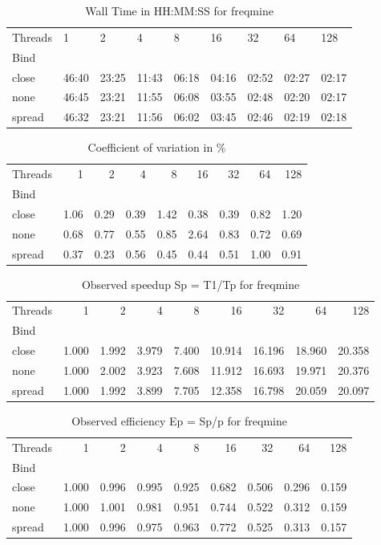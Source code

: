 \begin{table}
\caption{Wall Time in HH:MM:SS for freqmine}
\label{tab:time_freqmine}
\begin{tabular}{lllllllll}
\toprule
Threads & 1 & 2 & 4 & 8 & 16 & 32 & 64 & 128 \\
Bind &  &  &  &  &  &  &  &  \\
\midrule
close & 46:40 & 23:25 & 11:43 & 06:18 & 04:16 & 02:52 & 02:27 & 02:17 \\
none & 46:45 & 23:21 & 11:55 & 06:08 & 03:55 & 02:48 & 02:20 & 02:17 \\
spread & 46:32 & 23:21 & 11:56 & 06:02 & 03:45 & 02:46 & 02:19 & 02:18 \\
\bottomrule
\end{tabular}
\end{table}
\begin{table}
\caption{Coefficient of variation in \%}
\label{tab:cv_freqmine}
\begin{tabular}{lrrrrrrrr}
\toprule
Threads & 1 & 2 & 4 & 8 & 16 & 32 & 64 & 128 \\
Bind &  &  &  &  &  &  &  &  \\
\midrule
close & 1.06 & 0.29 & 0.39 & 1.42 & 0.38 & 0.39 & 0.82 & 1.20 \\
none & 0.68 & 0.77 & 0.55 & 0.85 & 2.64 & 0.83 & 0.72 & 0.69 \\
spread & 0.37 & 0.23 & 0.56 & 0.45 & 0.44 & 0.51 & 1.00 & 0.91 \\
\bottomrule
\end{tabular}
\end{table}
\begin{table}
\caption{Observed speedup Sp = T1/Tp for freqmine}
\label{tab:speedup_freqmine}
\begin{tabular}{lrrrrrrrr}
\toprule
Threads & 1 & 2 & 4 & 8 & 16 & 32 & 64 & 128 \\
Bind &  &  &  &  &  &  &  &  \\
\midrule
close & 1.000 & 1.992 & 3.979 & 7.400 & 10.914 & 16.196 & 18.960 & 20.358 \\
none & 1.000 & 2.002 & 3.923 & 7.608 & 11.912 & 16.693 & 19.971 & 20.376 \\
spread & 1.000 & 1.992 & 3.899 & 7.705 & 12.358 & 16.798 & 20.059 & 20.097 \\
\bottomrule
\end{tabular}
\end{table}
\begin{table}
\caption{Observed efficiency Ep = Sp/p for freqmine}
\label{tab:eff_freqmine}
\begin{tabular}{lrrrrrrrr}
\toprule
Threads & 1 & 2 & 4 & 8 & 16 & 32 & 64 & 128 \\
Bind &  &  &  &  &  &  &  &  \\
\midrule
close & 1.000 & 0.996 & 0.995 & 0.925 & 0.682 & 0.506 & 0.296 & 0.159 \\
none & 1.000 & 1.001 & 0.981 & 0.951 & 0.744 & 0.522 & 0.312 & 0.159 \\
spread & 1.000 & 0.996 & 0.975 & 0.963 & 0.772 & 0.525 & 0.313 & 0.157 \\
\bottomrule
\end{tabular}
\end{table}
